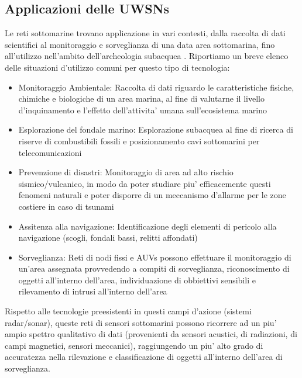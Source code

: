 \subsection{Applicazioni delle UWSNs}
Le reti sottomarine trovano applicazione in vari contesti, dalla raccolta di dati scientifici al monitoraggio e sorveglianza di una data area sottomarina, fino all'utilizzo nell'ambito dell'archeologia subacquea \cite{underwater}.\newline
Riportiamo un breve elenco delle situazioni d'utilizzo comuni per questo tipo di tecnologia:\newline
\begin{itemize}
\item Monitoraggio Ambientale:  \newline
Raccolta di dati riguardo le caratteristiche fisiche, chimiche e biologiche di un area marina, al fine di valutarne il livello d'inquinamento e l'effetto dell'attivita' umana sull'ecosistema marino\newline
\item Esplorazione del fondale marino: \newline
Esplorazione subacquea al fine di ricerca di riserve di combustibili fossili e posizionamento cavi sottomarini per telecomunicazioni\newline
\item Prevenzione di disastri:\newline
Monitoraggio di area ad alto rischio sismico/vulcanico, in modo da poter studiare piu' efficacemente questi fenomeni naturali e poter disporre di un meccanismo d'allarme per le zone costiere in caso di tsunami\newline
\item Assitenza alla navigazione: \newline
Identificazione degli elementi di pericolo alla navigazione (scogli, fondali bassi, relitti affondati)\newline
\item Sorveglianza:\newline
Reti di nodi fissi e AUVs possono effettuare il monitoraggio di un'area assegnata provvedendo a compiti di sorveglianza, riconoscimento di oggetti all'interno dell'area, individuazione di obbiettivi sensibili e rilevamento di intrusi all'interno dell'area
\end{itemize}
Rispetto alle tecnologie preesistenti in questi campi d'azione (sistemi radar/sonar), queste reti di sensori sottomarini possono ricorrere ad un piu' ampio spettro qualitativo di dati (provenienti da sensori acustici, di radiazioni, di campi magnetici, sensori meccanici), raggiungendo un piu' alto grado di accuratezza nella rilevazione e classificazione di oggetti all'interno dell'area di sorveglianza.\newline

